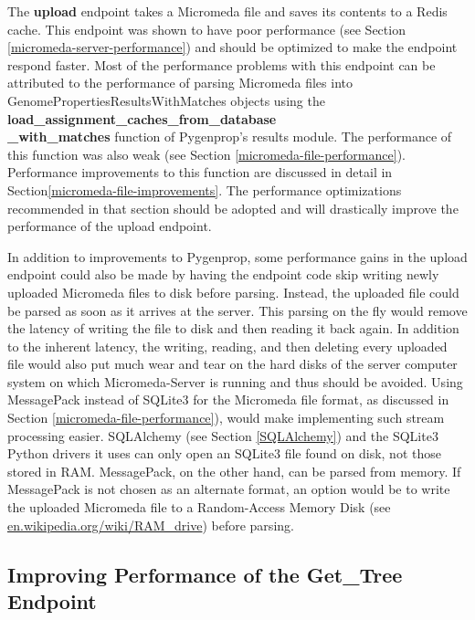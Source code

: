 The \textbf{upload} endpoint takes a Micromeda file and saves its contents to a Redis cache. This endpoint was shown to have poor performance (see Section \ref{micromeda-server-performance}) and should be optimized to make the endpoint respond faster. Most of the performance problems with this endpoint can be attributed to the performance of parsing Micromeda files into GenomePropertiesResultsWithMatches objects using the \textbf{load\_assignment\_caches\_from\_database \\ \_with\_matches} function of Pygenprop's results module. The performance of this function was also weak (see Section \ref{micromeda-file-performance}). Performance improvements to this function are discussed in detail in Section\ref{micromeda-file-improvements}. The performance optimizations recommended in that section should be adopted and will drastically improve the performance of the upload endpoint. 

In addition to improvements to Pygenprop, some performance gains in the upload endpoint could also be made by having the endpoint code skip writing newly uploaded Micromeda files to disk before parsing. Instead, the uploaded file could be parsed as soon as it arrives at the server. This parsing on the fly would remove the latency of writing the file to disk and then reading it back again. In addition to the inherent latency, the writing, reading, and then deleting every uploaded file would also put much wear and tear on the hard disks of the server computer system on which Micromeda-Server is running and thus should be avoided. Using MessagePack instead of SQLite3 for the Micromeda file format, as discussed in Section \ref{micromeda-file-performance}), would make implementing such stream processing easier. SQLAlchemy (see Section \ref{SQLAlchemy}) and the SQLite3 Python drivers it uses can only open an SQLite3 file found on disk, not those stored in RAM. MessagePack, on the other hand, can be parsed from memory. If MessagePack is not chosen as an alternate format, an option would be to write the uploaded Micromeda file to a Random-Access Memory Disk (see \href{en.wikipedia.org/wiki/RAM\_drive}{en.wikipedia.org/wiki/RAM\_drive}) before parsing.

\subsection{Improving Performance of the Get\_Tree Endpoint}

